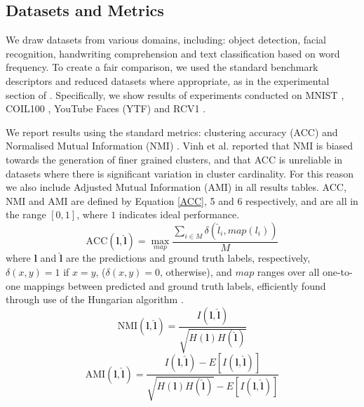 \documentclass[letterpaper, 11pt]{IEEEtran}
\begin{document}
\subsection{Datasets and Metrics}
We draw datasets from various domains, including: object detection, facial recognition, handwriting comprehension and text classification based on word frequency. To create a fair comparison, we used the standard benchmark descriptors and reduced datasets where appropriate, as in the experimental section of \cite{shah2018deep}.
Specifically, we show results of experiments conducted on MNIST \cite{LeCun1998},  COIL100 \cite{Nene1996}, YouTube Faces (YTF) \cite{Wolf2011} and RCV1 \cite{Lewis2004}.

\medskip
We report results using the standard metrics: clustering accuracy (ACC) \cite{Yang2010} and Normalised Mutual Information (NMI) \cite{Strehl2002}.  Vinh et al. \cite{Vinh:2010:ITM:1756006.1953024} reported that NMI is biased towards the generation of finer grained clusters, and that ACC is unreliable in datasets where there is significant variation in cluster cardinality. For this reason we also include Adjusted Mutual Information (AMI) \cite{Vinh:2010:ITM:1756006.1953024} in all results tables.
ACC, NMI and AMI are defined by Equation \ref{ACC}, 5 and 6
respectively, and are all in the range $[0,1]$, where $1$ indicates ideal performance.
    \begin{equation}\label{ACC}
        \text{ACC}(\mathbf{l}, \hat{\mathbf{l}}) = \max_{map} \frac{\sum_{i \in{M}} \delta(\hat{l}_i,  map(l_i) )}{M}
    \end{equation}
    where $\mathbf{l}$ and $\hat{\mathbf{l}}$ are the predictions and ground truth labels, respectively, $\delta(x, y) = 1$ if $x = y$,  ($\delta(x, y) = 0$, otherwise), and $map$ ranges over all one-to-one mappings between predicted and ground truth labels, efficiently found through use of the Hungarian algorithm \cite{Kuhn1955}.
    \begin{equation}\label{NMI}
        \text{NMI}(\mathbf{l}, \hat{\mathbf{l}}) = \frac{I(\mathbf{l}, \hat{\mathbf{l}})}{\sqrt{H(\mathbf{l})H(\hat{\mathbf{l}})}}
    \end{equation}
    \begin{equation}\label{AMI}
        \text{AMI}(\mathbf{l}, \hat{\mathbf{l}}) = \frac{I(\mathbf{l}, \hat{\mathbf{l}}) - E[I(\mathbf{l, \hat{l}})]}{\sqrt{H(\mathbf{l})H(\hat{\mathbf{l}})} - E[I(\mathbf{l},\mathbf{\hat{l}})]}
    \end{equation}
\end{document}
